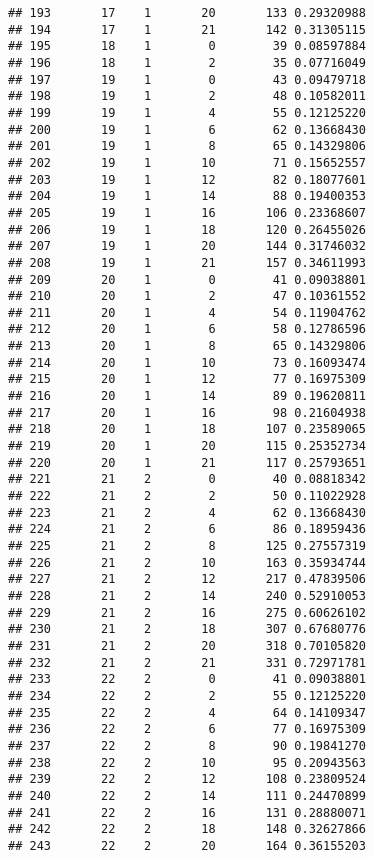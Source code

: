 \documentclass[
]{article}
\begin{document}
\begin{verbatim}
## 193       17    1       20       133 0.29320988
## 194       17    1       21       142 0.31305115
## 195       18    1        0        39 0.08597884
## 196       18    1        2        35 0.07716049
## 197       19    1        0        43 0.09479718
## 198       19    1        2        48 0.10582011
## 199       19    1        4        55 0.12125220
## 200       19    1        6        62 0.13668430
## 201       19    1        8        65 0.14329806
## 202       19    1       10        71 0.15652557
## 203       19    1       12        82 0.18077601
## 204       19    1       14        88 0.19400353
## 205       19    1       16       106 0.23368607
## 206       19    1       18       120 0.26455026
## 207       19    1       20       144 0.31746032
## 208       19    1       21       157 0.34611993
## 209       20    1        0        41 0.09038801
## 210       20    1        2        47 0.10361552
## 211       20    1        4        54 0.11904762
## 212       20    1        6        58 0.12786596
## 213       20    1        8        65 0.14329806
## 214       20    1       10        73 0.16093474
## 215       20    1       12        77 0.16975309
## 216       20    1       14        89 0.19620811
## 217       20    1       16        98 0.21604938
## 218       20    1       18       107 0.23589065
## 219       20    1       20       115 0.25352734
## 220       20    1       21       117 0.25793651
## 221       21    2        0        40 0.08818342
## 222       21    2        2        50 0.11022928
## 223       21    2        4        62 0.13668430
## 224       21    2        6        86 0.18959436
## 225       21    2        8       125 0.27557319
## 226       21    2       10       163 0.35934744
## 227       21    2       12       217 0.47839506
## 228       21    2       14       240 0.52910053
## 229       21    2       16       275 0.60626102
## 230       21    2       18       307 0.67680776
## 231       21    2       20       318 0.70105820
## 232       21    2       21       331 0.72971781
## 233       22    2        0        41 0.09038801
## 234       22    2        2        55 0.12125220
## 235       22    2        4        64 0.14109347
## 236       22    2        6        77 0.16975309
## 237       22    2        8        90 0.19841270
## 238       22    2       10        95 0.20943563
## 239       22    2       12       108 0.23809524
## 240       22    2       14       111 0.24470899
## 241       22    2       16       131 0.28880071
## 242       22    2       18       148 0.32627866
## 243       22    2       20       164 0.36155203

\end{verbatim}
\end{document}
